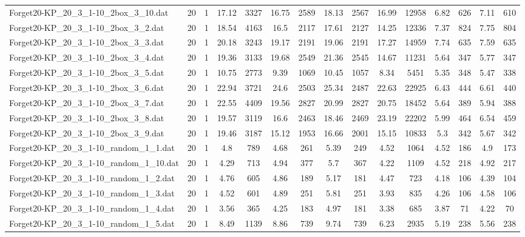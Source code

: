 \begin{table}[!ht]
{\begin{tabular}{lcccccccccccccc}
Forget20-KP\_20\_3\_1-10\_2box\_3\_10.dat & 20 & 1 & 17.12 & 3327 & 16.75 & 2589 & 18.13 & 2567 & 16.99 & 12958 & 6.82 & 626 & 7.11 & 610 \\
Forget20-KP\_20\_3\_1-10\_2box\_3\_2.dat & 20 & 1 & 18.54 & 4163 & 16.5 & 2117 & 17.61 & 2127 & 14.25 & 12336 & 7.37 & 824 & 7.75 & 804 \\
Forget20-KP\_20\_3\_1-10\_2box\_3\_3.dat & 20 & 1 & 20.18 & 3243 & 19.17 & 2191 & 19.06 & 2191 & 17.27 & 14959 & 7.74 & 635 & 7.59 & 635 \\
Forget20-KP\_20\_3\_1-10\_2box\_3\_4.dat & 20 & 1 & 19.36 & 3133 & 19.68 & 2549 & 21.36 & 2545 & 14.67 & 11231 & 5.64 & 347 & 5.77 & 347 \\
Forget20-KP\_20\_3\_1-10\_2box\_3\_5.dat & 20 & 1 & 10.75 & 2773 & 9.39 & 1069 & 10.45 & 1057 & 8.34 & 5451 & 5.35 & 348 & 5.47 & 338 \\
Forget20-KP\_20\_3\_1-10\_2box\_3\_6.dat & 20 & 1 & 22.94 & 3721 & 24.6 & 2503 & 25.34 & 2487 & 22.63 & 22925 & 6.43 & 444 & 6.61 & 440 \\
Forget20-KP\_20\_3\_1-10\_2box\_3\_7.dat & 20 & 1 & 22.55 & 4409 & 19.56 & 2827 & 20.99 & 2827 & 20.75 & 18452 & 5.64 & 389 & 5.94 & 388 \\
Forget20-KP\_20\_3\_1-10\_2box\_3\_8.dat & 20 & 1 & 19.57 & 3119 & 16.6 & 2463 & 18.46 & 2469 & 23.19 & 22202 & 5.99 & 464 & 6.54 & 459 \\
Forget20-KP\_20\_3\_1-10\_2box\_3\_9.dat & 20 & 1 & 19.46 & 3187 & 15.12 & 1953 & 16.66 & 2001 & 15.15 & 10833 & 5.3 & 342 & 5.67 & 342 \\
Forget20-KP\_20\_3\_1-10\_random\_1\_1.dat & 20 & 1 & 4.8 & 789 & 4.68 & 261 & 5.39 & 249 & 4.52 & 1064 & 4.52 & 186 & 4.9 & 173 \\
Forget20-KP\_20\_3\_1-10\_random\_1\_10.dat & 20 & 1 & 4.29 & 713 & 4.94 & 377 & 5.7 & 367 & 4.22 & 1109 & 4.52 & 218 & 4.92 & 217 \\
Forget20-KP\_20\_3\_1-10\_random\_1\_2.dat & 20 & 1 & 4.76 & 605 & 4.86 & 189 & 5.17 & 181 & 4.47 & 723 & 4.18 & 106 & 4.39 & 104 \\
Forget20-KP\_20\_3\_1-10\_random\_1\_3.dat & 20 & 1 & 4.52 & 601 & 4.89 & 251 & 5.81 & 251 & 3.93 & 835 & 4.26 & 106 & 4.58 & 106 \\
Forget20-KP\_20\_3\_1-10\_random\_1\_4.dat & 20 & 1 & 3.56 & 365 & 4.25 & 183 & 4.97 & 181 & 3.38 & 685 & 3.87 & 71 & 4.22 & 70 \\
Forget20-KP\_20\_3\_1-10\_random\_1\_5.dat & 20 & 1 & 8.49 & 1139 & 8.86 & 739 & 9.74 & 739 & 6.23 & 2935 & 5.19 & 238 & 5.56 & 238 \\

\end{tabular}}
\end{table}
